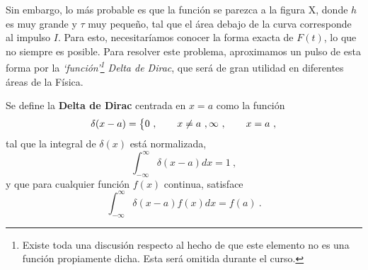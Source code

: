 Sin embargo, lo más probable es que la función se parezca a la figura X, donde $h$ es muy grande y $\tau$ muy pequeño, tal que el área debajo de la curva corresponde al impulso $I$. Para esto, necesitaríamos conocer la forma exacta de $F(t)$, lo que no siempre es posible. Para resolver este problema, aproximamos un pulso de esta forma por la \emph{`función'\footnote{Existe toda una discusión respecto al hecho de que este elemento no es una función propiamente dicha. Esta será omitida durante el curso.} Delta de Dirac}, que será de gran utilidad en diferentes áreas de la Física.

\begin{defi}
    Se define la \textbf{Delta de Dirac} centrada en $x=a$ como la función
    \begin{equation}
        \delta(x-a) = \begin{dcases}
            0 \ , \qquad x \neq a \ ,
            \infty \ , \qquad x = a \ ,
        \end{dcases}
    \end{equation}
    tal que la integral de $\delta(x)$ está normalizada,
    \begin{equation}
        \int_{-\infty}^{\infty} \delta(x-a) dx = 1 \ ,
    \end{equation}
    y que para cualquier función $f(x)$ continua, satisface
    \begin{equation}
        \int_{-\infty}^{\infty} \delta(x-a) f(x) dx = f(a) \ .
    \end{equation}
\end{defi}

